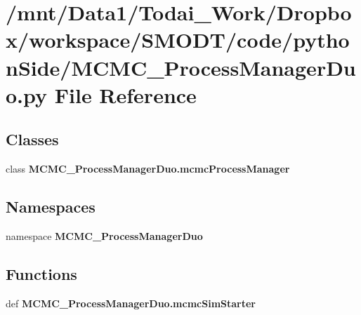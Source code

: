 \section{/mnt/\-Data1/\-Todai\-\_\-\-Work/\-Dropbox/workspace/\-S\-M\-O\-D\-T/code/python\-Side/\-M\-C\-M\-C\-\_\-\-Process\-Manager\-Duo.py File Reference}
\label{_m_c_m_c___process_manager_duo_8py}
\subsection*{Classes}
\begin{DoxyCompactItemize}
\item 
class {\bf M\-C\-M\-C\-\_\-\-Process\-Manager\-Duo.\-mcmc\-Process\-Manager}
\end{DoxyCompactItemize}
\subsection*{Namespaces}
\begin{DoxyCompactItemize}
\item 
namespace {\bf M\-C\-M\-C\-\_\-\-Process\-Manager\-Duo}
\end{DoxyCompactItemize}
\subsection*{Functions}
\begin{DoxyCompactItemize}
\item 
def {\bf M\-C\-M\-C\-\_\-\-Process\-Manager\-Duo.\-mcmc\-Sim\-Starter}
\end{DoxyCompactItemize}
